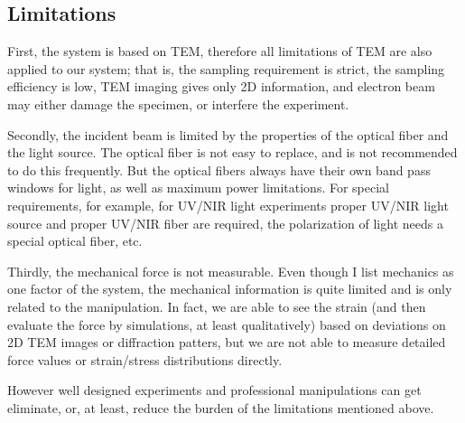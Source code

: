 \subsection{Limitations}
First, the system is based on TEM, therefore all limitations of TEM are also applied to our system; that is, the sampling requirement is strict, the sampling efficiency is low, TEM imaging gives only 2D information, and electron beam may either damage the specimen, or interfere the experiment. 

Secondly, the incident beam is limited by the properties of the optical fiber and the light source. The optical fiber is not easy to replace, and is not recommended to do this frequently. But the optical fibers always have their own band pass windows for light, as well as maximum power limitations. 
For special requirements, for example, for UV/NIR light experiments proper UV/NIR light source and proper UV/NIR fiber are required, the polarization of light needs a special optical fiber, etc. 

Thirdly, the mechanical force is not measurable. Even though I list mechanics as one factor of the system, the mechanical information is quite limited and is only related to the manipulation. In fact, we are able to see the strain (and then evaluate the force by simulations, at least qualitatively) based on deviations on 2D TEM images or diffraction patters, but we are not able to measure detailed force values or strain/stress distributions directly. 

However well designed experiments and professional manipulations can get eliminate, or, at least, reduce the burden of the limitations mentioned above. 
